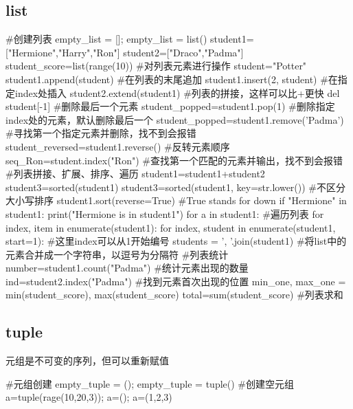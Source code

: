 \documentclass{article}
\begin{document}
    \subsection{list}
      \begin{codeblock}[language=python, caption={basic operations of list}]
        #创建列表
        empty_list = []; empty_list = list()
        student1=["Hermione","Harry","Ron"]
        student2=["Draco","Padma"]
        student_score=list(range(10))
        #对列表元素进行操作
        student="Potter"
        student1.append(student) #在列表的末尾追加
        student1.insert(2, student) #在指定index处插入
        student2.extend(student1) #列表的拼接，这样可以比+更快
        del student[-1] #删除最后一个元素
        student_popped=student1.pop(1) #删除指定index处的元素，默认删除最后一个
        student_popped=student1.remove('Padma') #寻找第一个指定元素并删除，找不到会报错
        student_reversed=student1.reverse() #反转元素顺序
        seq_Ron=student.index("Ron") #查找第一个匹配的元素并输出，找不到会报错
        #列表拼接、扩展、排序、遍历
        student1=student1+student2
        student3=sorted(student1)
        student3=sorted(student1, key=str.lower()) #不区分大小写排序
        student1.sort(reverse=True) #True stands for down
        if "Hermione" in student1:
          print("Hermione is in student1")
        for a in student1: #遍历列表
        for index, item in enumerate(student1):
        for index, student in enumerate(student1, start=1): #这里index可以从1开始编号
        students = ', '.join(student1) #将list中的元素合并成一个字符串，以逗号为分隔符
        #列表统计
        number=student1.count("Padma") #统计元素出现的数量
        ind=student2.index("Padma") #找到元素首次出现的位置
        min_one, max_one = min(student_score), max(student_score)
        total=sum(student_score) #列表求和
      \end{codeblock}

    \subsection{tuple}
      元组是不可变的序列，但可以重新赋值
      \begin{codeblock}[language=python, caption={basic operation of tuple}]
        #元组创建
        empty_tuple = (); empty_tuple = tuple() #创建空元组
        a=tuple(rage(10,20,3)); a=(); a=(1,2,3)
      \end{codeblock}
\end{document}
